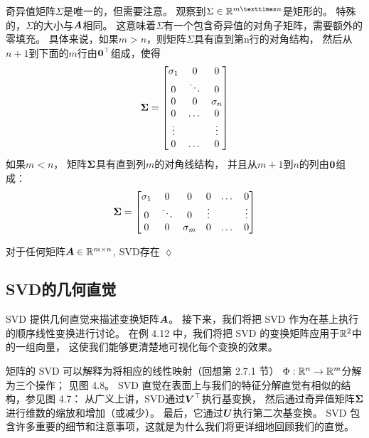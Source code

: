 奇异值矩阵$\Sigma$是唯一的，但需要注意。
观察到$\Sigma \in \R^{m×n}$是矩形的。
特殊的，$\Sigma$的大小与$\boldsymbol{A}$相同。
这意味着$\Sigma$有一个包含奇异值的对角子矩阵，需要额外的零填充。
具体来说，如果$m > n$，则矩阵$\Sigma$具有直到第n行的对角结构，
然后从$n + 1$到下面的$m$行由$\boldsymbol{0}^\top$组成，使得
\begin{equation}
    \boldsymbol{\Sigma} =
    \begin{bmatrix}
        \sigma_1 & 0 & 0 \\
        0 & \ddots & 0 \\
        0 & 0 & \sigma_n \\
        0 & \dots & 0 \\
        \vdots & & \vdots \\
        0 & \dots & 0
    \end{bmatrix}
\end{equation}
如果$m < n$，
矩阵$\boldsymbol{\Sigma}$具有直到列$m$的对角线结构，
并且从$m + 1$到$n$的列由$\boldsymbol{0}$组成：
\begin{equation}
    \boldsymbol{\Sigma} =
    \begin{bmatrix}
        \sigma_1 & 0 & 0 & 0 & \dots & 0 \\
        0 & \ddots & 0 & \vdots & & \vdots \\
        0 & 0 & \sigma_m & 0 & \dots & 0
   \end{bmatrix}
\end{equation}
\begin{remark}
    对于任何矩阵$\boldsymbol{A} \in \mathbb{R}^{m \times n}$, SVD存在
    \hfill $\lozenge$
\end{remark}

\subsection{SVD的几何直觉}
SVD 提供几何直觉来描述变换矩阵$\boldsymbol{A}$。
接下来，我们将把 SVD 作为在基上执行的顺序线性变换进行讨论。
在例 4.12 中，我们将把 SVD 的变换矩阵应用于$\mathbb{R}^2$中的一组向量，
这使我们能够更清楚地可视化每个变换的效果。

矩阵的 SVD 可以解释为将相应的线性映射（回想第 2.7.1 节）
$\Phi : \mathbb{R}^n \rightarrow \mathbb{R}^m$分解为三个操作； 见图 4.8。
SVD 直觉在表面上与我们的特征分解直觉有相似的结构，参见图 4.7：
从广义上讲，SVD通过$\boldsymbol{V}^\top$执行基变换，
然后通过奇异值矩阵$\boldsymbol{\Sigma}$进行维数的缩放和增加（或减少）。
最后，它通过$\boldsymbol{U}$执行第二次基变换。
SVD 包含许多重要的细节和注意事项，这就是为什么我们将更详细地回顾我们的直觉。

